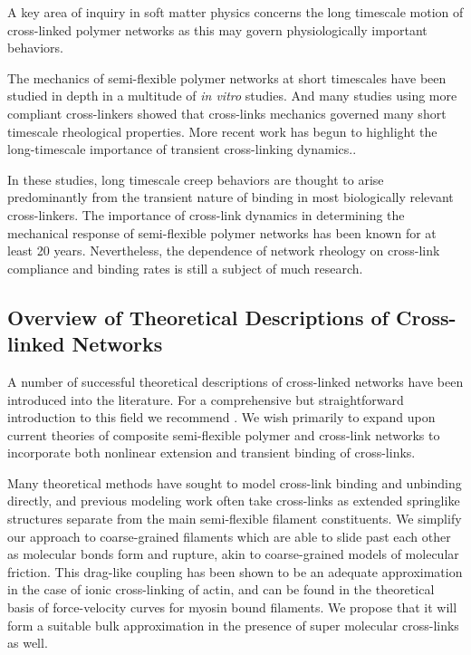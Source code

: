 \documentclass[pre,preprint]{revtex4-1}
\begin{document}
A key area of inquiry in soft matter physics concerns the long timescale motion of cross-linked polymer networks as this may govern physiologically important behaviors\cite{cell_rheo}. 

The mechanics of semi-flexible polymer networks at short timescales have been studied in depth in a multitude of {\em in vitro} studies\cite{rheo_actingel,rheo_bench,rheo_marge}.  And many studies using more compliant cross-linkers showed that cross-links mechanics governed many short timescale rheological properties\cite{rheo_crosslink_nonlin1,rheo_crosslink_nonlin2,rheo_crosslink_nonlin3,rheo_crosslink_notactin,rheo_crosslinkcompare,rheo_crosslinkreview}.  More recent work has begun to highlight the long-timescale importance of transient cross-linking dynamics.\cite{rheo_crosslinkslip1,rheo_crosslinkslip2,rheo_crosslinkslip3,rheo_nonaffine}.

In these studies, long timescale creep behaviors are thought to arise predominantly from the transient nature of binding in most biologically relevant cross-linkers\cite{rheo_crosslinkslip2}.  The importance of cross-link dynamics in determining the mechanical response of semi-flexible polymer networks has been known for at least 20 years\cite{rheo_crosslinksmatter}.  Nevertheless, the dependence of network rheology on cross-link compliance and binding rates is still a subject of much research\cite{theo_crosslinkslip2}.  

\subsection{Overview of Theoretical Descriptions of Cross-linked Networks}
A number of successful theoretical descriptions of cross-linked networks have been introduced into the literature\cite{theo_hlm,theo_best,theo_nonaffine2,theo_floppy,theo_crosslinknonlinear}.  For a comprehensive but straightforward introduction to this field we recommend \cite{megareview}.  We wish primarily to expand upon current theories of composite semi-flexible polymer and cross-link networks to incorporate both nonlinear extension and transient binding of cross-links.  

Many theoretical methods have sought to model cross-link binding and unbinding directly\cite{theo_crosslinkslip1,theo_crosslinkslip2}, and previous modeling work often take cross-links as extended springlike structures \cite{model_taeyoon} separate from the main semi-flexible filament constituents.  We simplify our approach to coarse-grained filaments which are able to slide past each other as molecular bonds form and rupture, akin to coarse-grained models of molecular friction\cite{theo_friction,theo_frictionSam,theo_molefric}.  This drag-like coupling has been shown to be an adequate approximation in the case of ionic cross-linking of actin\cite{mol_fric,theo_hydroish2}, and can be found in the theoretical basis of force-velocity curves for myosin bound filaments\cite{theo_frictionShila}. We propose that it will form a suitable bulk approximation in the presence of super molecular cross-links as well.
\end{document}
